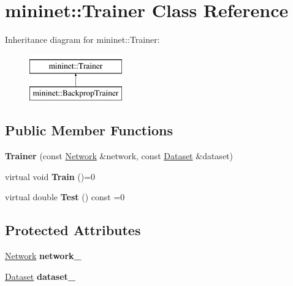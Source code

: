 \hypertarget{classmininet_1_1_trainer}{}\section{mininet\+:\+:Trainer Class Reference}
\label{classmininet_1_1_trainer}
Inheritance diagram for mininet\+:\+:Trainer\+:\begin{figure}[H]
\begin{center}
\leavevmode
\includegraphics[height=2.000000cm]{classmininet_1_1_trainer}
\end{center}
\end{figure}
\subsection*{Public Member Functions}
\begin{DoxyCompactItemize}
\item 
\hypertarget{classmininet_1_1_trainer_a10eb9b167eec0d9d62ed4441b8addf76}{}\label{classmininet_1_1_trainer_a10eb9b167eec0d9d62ed4441b8addf76} 
{\bfseries Trainer} (const \hyperlink{classmininet_1_1_network}{Network} \&network, const \hyperlink{classmininet_1_1_dataset}{Dataset} \&dataset)
\item 
\hypertarget{classmininet_1_1_trainer_a95c8f8125656b15e5bef1f3a9a2cb6e2}{}\label{classmininet_1_1_trainer_a95c8f8125656b15e5bef1f3a9a2cb6e2} 
virtual void {\bfseries Train} ()=0
\item 
\hypertarget{classmininet_1_1_trainer_a0da2785efc9fbd2602651711b786560f}{}\label{classmininet_1_1_trainer_a0da2785efc9fbd2602651711b786560f} 
virtual double {\bfseries Test} () const =0
\end{DoxyCompactItemize}
\subsection*{Protected Attributes}
\begin{DoxyCompactItemize}
\item 
\hypertarget{classmininet_1_1_trainer_a7fe0129fba9e72f11ae32e33abc4df12}{}\label{classmininet_1_1_trainer_a7fe0129fba9e72f11ae32e33abc4df12} 
\hyperlink{classmininet_1_1_network}{Network} {\bfseries network\+\_\+}
\item 
\hypertarget{classmininet_1_1_trainer_a18121bfd6966a1b9db98f484b7bf0f2f}{}\label{classmininet_1_1_trainer_a18121bfd6966a1b9db98f484b7bf0f2f} 
\hyperlink{classmininet_1_1_dataset}{Dataset} {\bfseries dataset\+\_\+}
\end{DoxyCompactItemize}


